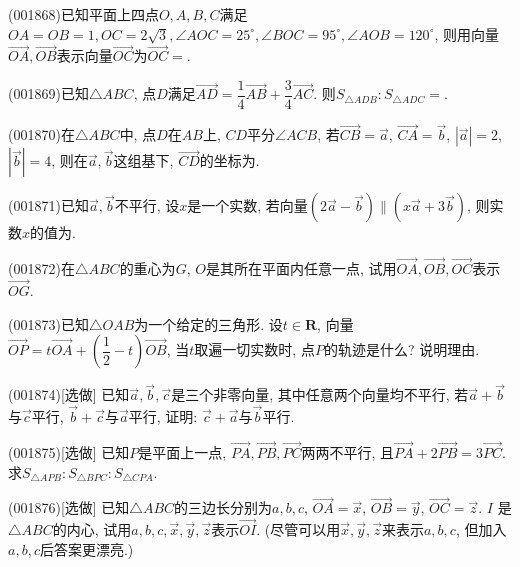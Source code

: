 \item (001868)已知平面上四点$O,A,B,C$满足$OA=OB=1, OC=2\sqrt3, \angle AOC=25^\circ, \angle BOC=95^\circ,\angle AOB=120^\circ$, 则用向量$\overrightarrow{OA},\overrightarrow{OB}$表示向量$\overrightarrow{OC}$为$\overrightarrow{OC}=$.
\item (001869)已知$\triangle ABC$, 点$D$满足$\overrightarrow{AD}=\dfrac{1}{4}\overrightarrow{AB}+\dfrac{3}{4}\overrightarrow{AC}$. 则$S_{\triangle ADB}:S_{\triangle ADC}=$.
\item (001870)在$\triangle ABC$中, 点$D$在$AB$上, $CD$平分$\angle ACB$, 若$\overrightarrow{CB}=\overrightarrow{a}$, $\overrightarrow{CA}=\overrightarrow{b}$, $|\overrightarrow{a}|=2$, $|\overrightarrow{b}|=4$, 则在$\overrightarrow{a},\overrightarrow{b}$这组基下, $\overrightarrow{CD}$的坐标为.
\item (001871)已知$\overrightarrow{a},\overrightarrow{b}$不平行, 设$x$是一个实数, 若向量$(2\overrightarrow{a}-\overrightarrow{b})\parallel (x\overrightarrow{a}+3\overrightarrow{b})$, 则实数$x$的值为.
\item (001872)在$\triangle ABC$的重心为$G$, $O$是其所在平面内任意一点, 试用$\overrightarrow{OA},\overrightarrow{OB},\overrightarrow{OC}$表示$\overrightarrow{OG}$.
\item (001873)已知$\triangle OAB$为一个给定的三角形. 设$t\in\mathbf{R}$, 向量$\overrightarrow{OP}=t\overrightarrow{OA}+(\dfrac{1}{2}-t)\overrightarrow{OB}$,
当$t$取遍一切实数时, 点$P$的轨迹是什么? 说明理由.
\item (001874)[选做]
已知$\overrightarrow{a},\overrightarrow{b},\overrightarrow{c}$是三个非零向量, 其中任意两个向量均不平行, 若$\overrightarrow{a}+\overrightarrow{b}$与$\overrightarrow{c}$平行, $\overrightarrow{b}+\overrightarrow{c}$与$\overrightarrow{a}$平行, 证明: $\overrightarrow{c}+\overrightarrow{a}$与$\overrightarrow{b}$平行.
\item (001875)[选做]
已知$P$是平面上一点, $\overrightarrow{PA},\overrightarrow{PB},\overrightarrow{PC}$两两不平行, 且$\overrightarrow{PA}+2\overrightarrow{PB}=3\overrightarrow{PC}$. 求$S_{\triangle APB}:S_{\triangle BPC}:S_{\triangle CPA}$.
\item (001876)[选做]
已知$\triangle ABC$的三边长分别为$a,b,c$, $\overrightarrow{OA}=\overrightarrow{x}$, $\overrightarrow{OB}=\overrightarrow{y}$, $\overrightarrow{OC}=\overrightarrow{z}$. $I$ 是$\triangle ABC$的内心, 试用$a,b,c,\overrightarrow{x},\overrightarrow{y},\overrightarrow{z}$表示$\overrightarrow{OI}$.
(尽管可以用$\overrightarrow{x},\overrightarrow{y},\overrightarrow{z}$来表示$a,b,c$, 但加入$a,b,c$后答案更漂亮.)
